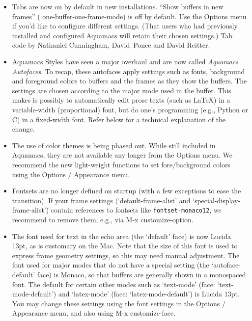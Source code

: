 \begin{itemize}

\item Tabs are now on by default in new installations. ``Show buffers in new frames'' ( one-buffer-one-frame-mode) is off by default.  Use the Options menu if you'd like to configure different settings.  (That users who had previously installed and configured Aquamacs will retain their chosen settings.)  
Tab code by Nathaniel Cunningham, David~Ponce and David Reitter.
 
\item Aquamacs Styles have seen a major overhaul and are now called {\em Aquamacs Autofaces}.  To recap, these autofaces apply settings such as fonts, background and foreground colors to buffers and the frames as they show the buffers.  The settings are chosen according to the major mode used in the buffer.  This makes is possibly to automatically edit prose texts (such as LaTeX) in a variable-width (proportional) font, but do one's programming (e.g., Python or C) in a fixed-width font.  
Refer below for a technical explanation of the change.

\item The use of color themes is being phased out.  While still included in Aquamacs, they are not available any longer from the Options menu.  We recommend the new light-weight functions to set fore/background colors using the Options / Appearance menu.

\item Fontsets are no longer defined on startup (with a few exceptions to ease the transition).  If your frame settings (`default-frame-alist' and `special-display-frame-alist') contain references to fontsets like {\tt fontset-monaco12}, we recommend to remove them, e.g., via M-x customize-option.

\item The font used for text in the echo area (the `default' face) is now Lucida 13pt, as is customary on the Mac.  Note that the size of this font is used to express frame geometry settings, so this may need manual adjustment.  The font used for major modes that do not have a special setting (the `autoface-default' face) is Monaco, so that buffers are generally shown in a monospaced font.  The default for certain other modes such as `text-mode' (face: `text-mode-default') and `latex-mode' (face: `latex-mode-default') is Lucida 13pt.  You may change these settings using the font settings in the Options / Appearance menu, and also using M-x customize-face.


\end{itemize}
